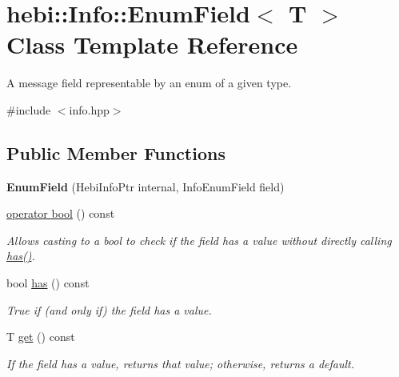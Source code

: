 \hypertarget{classhebi_1_1Info_1_1EnumField}{}\section{hebi\+:\+:Info\+:\+:Enum\+Field$<$ T $>$ Class Template Reference}
\label{classhebi_1_1Info_1_1EnumField}


A message field representable by an enum of a given type.  




{\ttfamily \#include $<$info.\+hpp$>$}

\subsection*{Public Member Functions}
\begin{DoxyCompactItemize}
\item 
{\bfseries Enum\+Field} (Hebi\+Info\+Ptr internal, Info\+Enum\+Field field)\hypertarget{classhebi_1_1Info_1_1EnumField_ad4680cb2ff477ed2dfb4ae47f0fd6836}{}\label{classhebi_1_1Info_1_1EnumField_ad4680cb2ff477ed2dfb4ae47f0fd6836}

\item 
\hyperlink{classhebi_1_1Info_1_1EnumField_a0a21c772969ad9822e53b997262f8957}{operator bool} () const 
\begin{DoxyCompactList}\small\item\em Allows casting to a bool to check if the field has a value without directly calling {\ttfamily \hyperlink{classhebi_1_1Info_1_1EnumField_acd877e3edf6c0a63ddda79e1148f71c9}{has()}}. \end{DoxyCompactList}\item 
bool \hyperlink{classhebi_1_1Info_1_1EnumField_acd877e3edf6c0a63ddda79e1148f71c9}{has} () const \hypertarget{classhebi_1_1Info_1_1EnumField_acd877e3edf6c0a63ddda79e1148f71c9}{}\label{classhebi_1_1Info_1_1EnumField_acd877e3edf6c0a63ddda79e1148f71c9}

\begin{DoxyCompactList}\small\item\em True if (and only if) the field has a value. \end{DoxyCompactList}\item 
T \hyperlink{classhebi_1_1Info_1_1EnumField_ad253318045089e8199ef080b8a195cee}{get} () const \hypertarget{classhebi_1_1Info_1_1EnumField_ad253318045089e8199ef080b8a195cee}{}\label{classhebi_1_1Info_1_1EnumField_ad253318045089e8199ef080b8a195cee}

\begin{DoxyCompactList}\small\item\em If the field has a value, returns that value; otherwise, returns a default. \end{DoxyCompactList}\end{DoxyCompactItemize}


